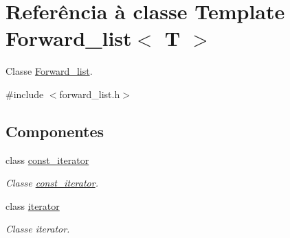 \hypertarget{class_forward__list}{}\section{Referência à classe Template Forward\+\_\+list$<$ T $>$}
\label{class_forward__list}


Classe \hyperlink{class_forward__list}{Forward\+\_\+list}.  




{\ttfamily \#include $<$forward\+\_\+list.\+h$>$}

\subsection*{Componentes}
\begin{DoxyCompactItemize}
\item 
class \hyperlink{class_forward__list_1_1const__iterator}{const\+\_\+iterator}
\begin{DoxyCompactList}\small\item\em Classe \hyperlink{class_forward__list_1_1const__iterator}{const\+\_\+iterator}. \end{DoxyCompactList}\item 
class \hyperlink{class_forward__list_1_1iterator}{iterator}
\begin{DoxyCompactList}\small\item\em Classe iterator. \end{DoxyCompactList}\end{DoxyCompactItemize}

